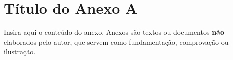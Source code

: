 
\section{Título do Anexo A}
\label{anx:anexo-a}

Insira aqui o conteúdo do anexo. Anexos são textos ou documentos
\textbf{não} elaborados pelo autor, que servem como fundamentação,
comprovação ou ilustração.


